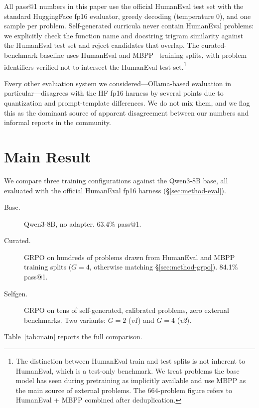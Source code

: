 \documentclass[11pt,a4paper]{article}
\begin{document}
All pass@1 numbers in this paper use the official HumanEval test set with the standard HuggingFace fp16 evaluator, greedy decoding (temperature 0), and one sample per problem.
Self-generated curricula never contain HumanEval problems: we explicitly check the function name and docstring trigram similarity against the HumanEval test set and reject candidates that overlap.
The curated-benchmark baseline uses HumanEval and MBPP~\citep{austin2021mbpp} training splits, with problem identifiers verified not to intersect the HumanEval test set.\footnote{%
The distinction between HumanEval train and test splits is not inherent to HumanEval, which is a test-only benchmark.
We treat problems the base model has seen during pretraining as implicitly available and use MBPP as the main source of external problems.
The 664-problem figure refers to HumanEval + MBPP combined after deduplication.}

Every other evaluation system we considered---Ollama-based evaluation in particular---disagrees with the HF fp16 harness by several points due to quantization and prompt-template differences.
We do not mix them, and we flag this as the dominant source of apparent disagreement between our numbers and informal reports in the community.

\section{Main Result}
\label{sec:main}

We compare three training configurations against the Qwen3-8B base, all evaluated with the official HumanEval fp16 harness (\S\ref{sec:method-eval}).

\begin{description}
    \item[Base.] Qwen3-8B, no adapter. 63.4\% pass@1.
    \item[Curated.] GRPO on hundreds of problems drawn from HumanEval and MBPP training splits ($G = 4$, otherwise matching \S\ref{sec:method-grpo}). 84.1\% pass@1.
    \item[Selfgen.] GRPO on tens of self-generated, calibrated problems, zero external benchmarks. Two variants: $G = 2$ (\emph{v1}) and $G = 4$ (\emph{v2}).
\end{description}

Table~\ref{tab:main} reports the full comparison.
\end{document}
